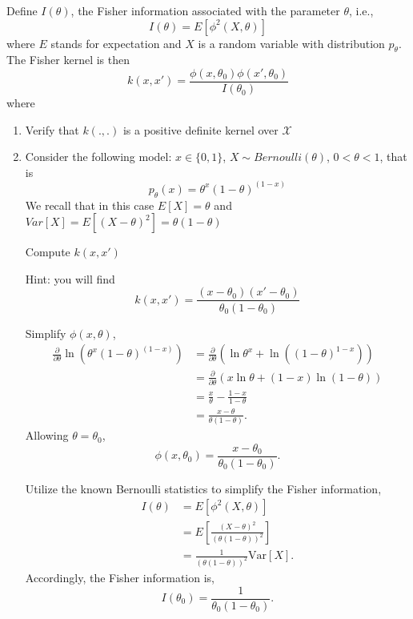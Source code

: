 \documentclass{article}[12pt]
\begin{document}
Define $I(\theta)$, the Fisher information associated with the parameter $\theta$, i.e., 
\begin{equation}
I(\theta)=E[\phi^2(X,\theta)]
\end{equation}
where $E$ stands for expectation and $X$ is a random variable with distribution $p_\theta$. 
The Fisher kernel is then 
\begin{equation}
k(x,x')=\frac{\phi(x,\theta_0)\phi(x',\theta_0)}{I(\theta_0)}
\end{equation}
where 
\begin{enumerate}
\item Verify that $k(.,.)$ is a positive definite kernel over $\mathcal{X}$
\item Consider the following model: $x \in \{0,1\}$, $X \sim Bernoulli(\theta)$, $0 < \theta < 1$, that is
\begin{equation}
p_\theta(x)=\theta^x(1-\theta)^{(1-x)} 
\end{equation}
We recall that in this case $E[X]=\theta$ and $Var[X]=E[(X-\theta)^2]=\theta(1-\theta)$

Compute $k(x,x')$

Hint: you will find $$k(x,x')=\frac{(x-\theta_0)(x'-\theta_0)}{\theta_0(1-\theta_0)}$$

Simplify $\phi(x, \theta)$,
\begin{equation}
\begin{aligned}
\frac{\partial }{\partial \theta} \ln \left(\theta^{x}(1-\theta)^{(1-x)} \right) &= \frac{\partial }{\partial \theta} \left( \ln \theta^x + \ln \left( \left( 1- \theta \right)^{1-x}\right)\right)  \\
&= \frac{\partial }{\partial \theta} \left( x\ln \theta + \left( 1- x \right)\ln \left(  1- \theta \right)\right) \\
&= \frac{x}{\theta} - \frac{1-x}{1-\theta} \\
&= \frac{x-\theta}{\theta(1-\theta)}.
\end{aligned}
\end{equation}
Allowing $\theta=\theta_0$,
\begin{equation}
\phi\left(x, \theta_{0}\right) = \frac{x-\theta_0}{\theta_0 \left( 1- \theta_0 \right)}.
\end{equation}

Utilize the known Bernoulli statistics to simplify the Fisher information,
\begin{equation}
\begin{aligned} I(\theta)&=E\left[\phi^{2}(X, \theta)\right] \\
&= E \left[ \frac{(X-\theta)^2}{(\theta(1-\theta))^2} \right] \\
&= \frac{1}{(\theta(1-\theta))^2} \text{Var}[X].
\end{aligned}
\end{equation} 
Accordingly, the Fisher information is,
\begin{equation}
 I(\theta_0)=\frac{1}{\theta_0(1-\theta_0)}.
\end{equation}


\end{enumerate}
\end{document}
